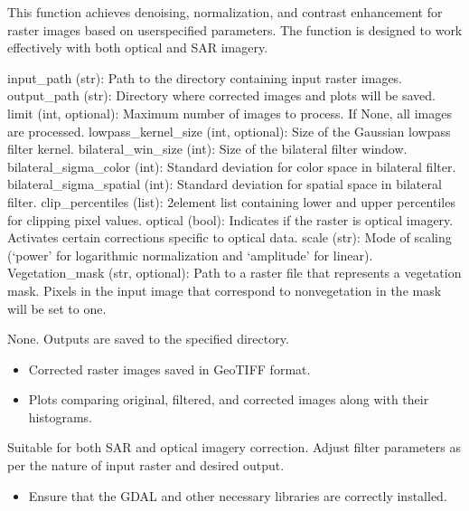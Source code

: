 \documentclass[letterpaper,10pt,english]{sphinxmanual}
\begin{document}
\begin{fulllineitems}
\sphinxAtStartPar
This function achieves denoising, normalization, and contrast enhancement for raster images
based on user\sphinxhyphen{}specified parameters. The function is designed to work effectively with both 
optical and SAR imagery.
\begin{description}
\sphinxAtStartPar
input\_path (str): Path to the directory containing input raster images.
output\_path (str): Directory where corrected images and plots will be saved.
limit (int, optional): Maximum number of images to process. If None, all images are processed.
lowpass\_kernel\_size (int, optional): Size of the Gaussian low\sphinxhyphen{}pass filter kernel.
bilateral\_win\_size (int): Size of the bilateral filter window.
bilateral\_sigma\_color (int): Standard deviation for color space in bilateral filter.
bilateral\_sigma\_spatial (int): Standard deviation for spatial space in bilateral filter.
clip\_percentiles (list): 2\sphinxhyphen{}element list containing lower and upper percentiles for clipping pixel values.
optical (bool): Indicates if the raster is optical imagery. Activates certain corrections specific to optical data.
scale (str): Mode of scaling (‘power’ for logarithmic normalization and ‘amplitude’ for linear).
Vegetation\_mask (str, optional): Path to a raster file that represents a vegetation mask. Pixels in the input image that correspond to non\sphinxhyphen{}vegetation in the mask will be set to one.

\sphinxAtStartPar
None. Outputs are saved to the specified directory.

\begin{itemize}
\item {} 
\sphinxAtStartPar
Corrected raster images saved in GeoTIFF format.

\item {} 
\sphinxAtStartPar
Plots comparing original, filtered, and corrected images along with their histograms.

\end{itemize}

\sphinxAtStartPar
Suitable for both SAR and optical imagery correction. Adjust filter parameters as per the nature of input raster
and desired output.

\begin{itemize}
\item {} 
\sphinxAtStartPar
Ensure that the GDAL and other necessary libraries are correctly installed.


\end{itemize}
\end{description}
\end{fulllineitems}
\end{document}
